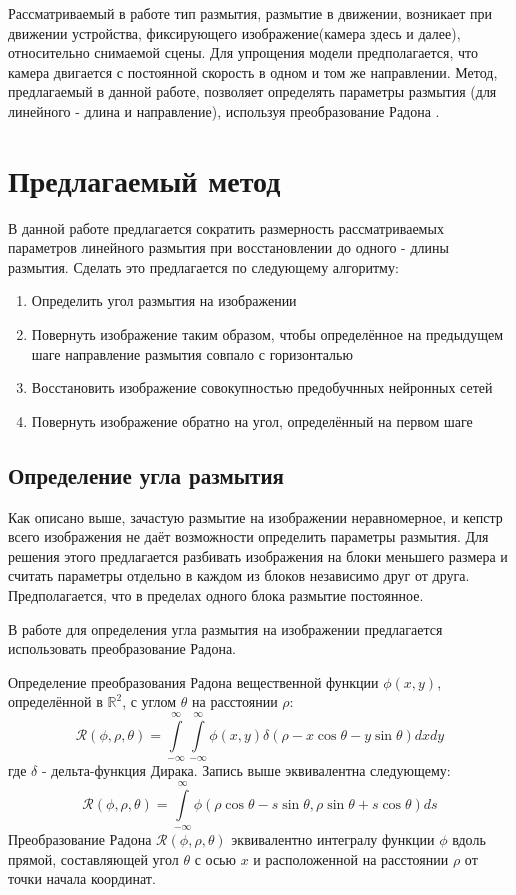 Рассматриваемый в работе тип размытия, размытие в движении, возникает при движении устройства, фиксирующего изображение(камера здесь и далее), относительно снимаемой сцены. 
Для упрощения модели предполагается, что камера двигается с постоянной скорость в одном и том же направлении. Метод, предлагаемый в данной работе, позволяет определять параметры размытия (для линейного - длина и направление), используя преобразование Радона \cite{oliv}.


\newpage
\section{Предлагаемый метод}

В данной работе предлагается сократить размерность рассматриваемых параметров линейного размытия при восстановлении до одного - длины размытия. Сделать это предлагается по следующему алгоритму:
\begin{enumerate} 
    \item Определить угол размытия на изображении
    \item Повернуть изображение таким образом, чтобы определённое на предыдущем шаге направление размытия совпало с горизонталью
    \item Восстановить изображение совокупностью предобучнных нейронных сетей 
    \item Повернуть изображение обратно на угол, определённый на первом шаге
\end{enumerate}


\subsection{Определение угла размытия}

Как описано выше, зачастую размытие на изображении неравномерное, и кепстр всего изображения не даёт возможности определить параметры размытия. Для решения этого предлагается разбивать изображения на блоки меньшего размера и считать параметры отдельно в каждом из блоков независимо друг от друга.
Предполагается, что в пределах одного блока размытие постоянное.

В работе для определения угла размытия на изображении предлагается использовать преобразование Радона.

Определение преобразования Радона вещественной функции $\phi(x, y)$,
определённой в $\mathbb{R}^{2}$, с углом $\theta$ на расстоянии $\rho$:
$$
\mathcal{R}(\phi, \rho, \theta)=\int\limits_{-\infty}^{\infty} \int\limits_{-\infty}^{\infty} \phi(x, y) 
\delta(\rho-x \cos \theta-y \sin \theta) d x d y
$$
где $\delta$ - дельта-функция Дирака. Запись выше эквивалентна следующему:
$$
\mathcal{R}(\phi, \rho, \theta)=\int\limits_{-\infty}^{\infty} 
\phi(\rho \cos \theta-s \sin \theta, \rho \sin \theta+s \cos \theta) d s
$$
Преобразование Радона $\mathcal{R}(\phi, \rho, \theta)$ 
эквивалентно интегралу функции $\phi$ вдоль прямой, составляющей угол $\theta$
с осью $x$ и расположенной на расстоянии $\rho$ от точки начала координат. 

